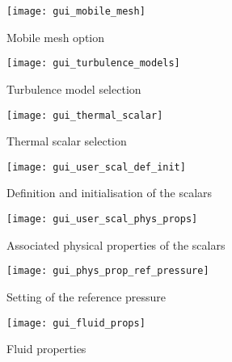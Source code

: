 {{\begin{figure}[!ht]
\begin{center}
\texttt{[image: gui\_mobile\_mesh]}
\caption{Mobile mesh option}
\label{fig:6_GUI}
\end{center}
\end{figure}

\begin{figure}[!ht]
\begin{center}
\texttt{[image: gui\_turbulence\_models]}
\caption{Turbulence model selection}
\label{fig:7_GUI}
\end{center}
\end{figure}

\begin{figure}[!ht]
\begin{center}
\texttt{[image: gui\_thermal\_scalar]}
\caption{Thermal scalar selection}
\label{fig:8_GUI}
\end{center}
\end{figure}

\begin{figure}[!ht]
\begin{center}
\texttt{[image: gui\_user\_scal\_def\_init]}
\caption{Definition and initialisation of the scalars}
\label{fig:11_GUI}
\end{center}
\end{figure}

\begin{figure}[!ht]
\begin{center}
\texttt{[image: gui\_user\_scal\_phys\_props]}
\caption{Associated physical properties of the scalars}
\label{fig:12_GUI}
\end{center}
\end{figure}

\begin{figure}[!ht]
\begin{center}
\texttt{[image: gui\_phys\_prop\_ref\_pressure]}
\caption{Setting of the reference pressure}
\label{fig:13_GUI}
\end{center}
\end{figure}

\begin{figure}[!ht]
\begin{center}
\texttt{[image: gui\_fluid\_props]}
\caption{Fluid properties}
\label{fig:14_GUI}
\end{center}
\end{figure}

}}
